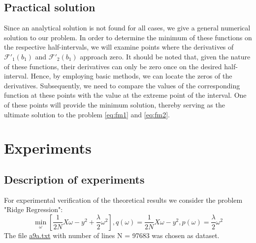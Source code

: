 \documentclass{article}
\begin{document}
\subsection{Practical solution}\label{eq:3.5}
Since an analytical solution is not found for all cases, we give a general numerical solution to our problem. In order to determine the minimum of these functions on the respective half-intervals, we will examine points where the derivatives of $\mathcal{F'}_1(b_1)$ and $\mathcal{F'}_2(b_1)$ approach zero. It should be noted that, given the nature of these functions, their derivatives can only be zero once on the desired half-interval. Hence, by employing basic methods, we can locate the zeros of the derivatives. Subsequently, we need to compare the values of the corresponding function at these points with the value at the extreme point of the interval. One of these points will provide the minimum solution, thereby serving as the ultimate solution to the problem \eqref{eq:fm1} and \eqref{eq:fm2}.

\section{Experiments}

\subsection{Description of experiments}
For experimental verification of the theoretical results we consider the problem "Ridge Regression": 
\begin{equation}
    \label{ridge}
    \underset{\omega}{\min}[ \frac{1}{2N} X\omega - y^2 + \frac{\lambda}{2}\omega^2], q(\omega) = \frac{1}{2N} X\omega - y^2, p(\omega) = \frac{\lambda}{2}\omega^2
\end{equation}
The file \href{https://www.csie.ntu.edu.tw/~cjlin/libsvmtools/datasets/binary.html#a1a}{a9a.txt} with number of lines N = 97683 was chosen as dataset.
\end{document}
